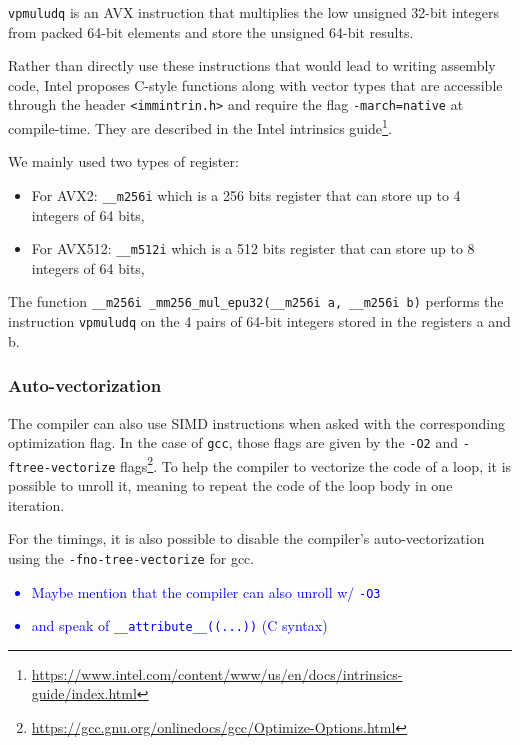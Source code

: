 \documentclass[a4paper]{article}
\begin{document}
\begin{example}
    \texttt{vpmuludq} is an AVX instruction that multiplies the low unsigned 32-bit integers from packed 64-bit elements
    and store the unsigned 64-bit results.
\end{example}

\bigskip
Rather than directly use these instructions that would lead to writing assembly code, Intel proposes C-style functions
along with vector types that are accessible through the header \texttt{<immintrin.h>} and require the flag \texttt{-march=native} at 
compile-time.
They are described in the Intel intrinsics guide\footnote{\url{https://www.intel.com/content/www/us/en/docs/intrinsics-guide/index.html}}.

\bigskip
We mainly used two types of register: 
\begin{itemize}
    \item For AVX2: \texttt{\_\_m256i} which is a 256 bits register that can store up to 4 integers of 64 bits,
    \item For AVX512: \texttt{\_\_m512i} which is a 512 bits register that can store up to 8 integers of 64 bits,
\end{itemize}


\begin{example}
    The function \texttt{\_\_m256i \_mm256\_mul\_epu32(\_\_m256i a, \_\_m256i b)} performs the instruction \texttt{vpmuludq}
    on the 4 pairs of 64-bit integers stored in the registers a and b.
\end{example}

\subsubsection{Auto-vectorization}

The compiler can also use SIMD instructions when asked with the corresponding
optimization flag. In the case of \texttt{gcc}, those flags are given by the
\texttt{-O2} and \texttt{-ftree-vectorize}
flags\footnote{\url{https://gcc.gnu.org/onlinedocs/gcc/Optimize-Options.html}}.
To help the compiler to vectorize the code of a loop, it is possible to
unroll it, meaning to repeat the code of the loop body in one iteration.

For the timings, it is also possible to disable the compiler's
auto-vectorization using the \texttt{-fno-tree-vectorize} for gcc.

\textcolor{blue}{
\begin{itemize}
    \item Maybe mention that the compiler can also unroll w/ \texttt{-O3}
    \item and speak of \texttt{\_\_attribute\_\_((...))} (C syntax)
\end{itemize}}
\end{document}

